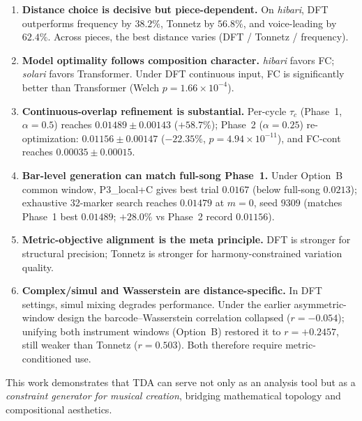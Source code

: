 \documentclass[conference,10pt,a4paper]{IEEEtran}
\begin{document}
\begin{enumerate}
\item \textbf{Distance choice is decisive but piece-dependent.}
      On \emph{hibari}, DFT outperforms frequency by $38.2\%$, Tonnetz
      by $56.8\%$, and voice-leading by $62.4\%$.
      Across pieces, the best distance varies (DFT / Tonnetz / frequency).

\item \textbf{Model optimality follows composition character.}
      \emph{hibari} favors FC; \emph{solari} favors Transformer.
      Under DFT continuous input, FC is significantly better than
      Transformer (Welch $p=1.66\times10^{-4}$).

\item \textbf{Continuous-overlap refinement is substantial.}
      Per-cycle $\tau_c$ (Phase~1, $\alpha=0.5$) reaches $0.01489 \pm 0.00143$ ($+58.7\%$);
      Phase~2 ($\alpha=0.25$) re-optimization: $\mathbf{0.01156 \pm 0.00147}$ ($-22.35\%$, $p=4.94\times10^{-11}$),
      and FC-cont reaches
      $0.00035 \pm 0.00015$.

\item \textbf{Bar-level generation can match full-song Phase~1.}
      Under Option~B common window, P3\_local+C gives best trial $0.0167$
      (below full-song $0.0213$); exhaustive 32-marker search reaches
      $0.01479$ at $m=0$, seed $9309$ (matches Phase~1 best $0.01489$;
      $+28.0\%$ vs Phase~2 record $0.01156$).

\item \textbf{Metric-objective alignment is the meta principle.}
      DFT is stronger for structural precision; Tonnetz is stronger for
      harmony-constrained variation quality.

\item \textbf{Complex/simul and Wasserstein are distance-specific.}
      In DFT settings, simul mixing degrades performance. Under the
      earlier asymmetric-window design the barcode--Wasserstein
      correlation collapsed ($r=-0.054$); unifying both instrument
      windows (Option~B) restored it to $r=+0.2457$, still weaker than
      Tonnetz ($r=0.503$). Both therefore require metric-conditioned use.
\end{enumerate}

This work demonstrates that TDA can serve not only as an analysis tool
but as a \emph{constraint generator for musical creation}, bridging
mathematical topology and compositional aesthetics.


\end{document}
